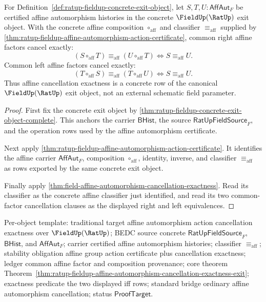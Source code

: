 \begin{theorem}
\label{thm:ratup-fieldup-affine-automorphism-cancellation-exactness-exit}
For Definition~\ref{def:ratup-fieldup-concrete-exit-object}, let
$S,T,U:\mathsf{AffAut}_F$ be certified affine automorphism histories in the
concrete $\FieldUp(\RatUp)$ exit object. With the concrete affine composition
$\circ_{\mathrm{aff}}$ and classifier $\equiv_{\mathrm{aff}}$ supplied by
\autoref{thm:ratup-fieldup-affine-automorphism-action-certificate}, common
right affine factors cancel exactly:
$$
(S\circ_{\mathrm{aff}}T)\equiv_{\mathrm{aff}}(U\circ_{\mathrm{aff}}T)
\Longleftrightarrow S\equiv_{\mathrm{aff}}U.
$$
Common left affine factors cancel exactly:
$$
(T\circ_{\mathrm{aff}}S)\equiv_{\mathrm{aff}}(T\circ_{\mathrm{aff}}U)
\Longleftrightarrow S\equiv_{\mathrm{aff}}U.
$$
Thus affine cancellation exactness is a concrete row of the canonical
$\FieldUp(\RatUp)$ exit object, not an external schematic field parameter.
\end{theorem}
\begin{proof}
First fix the concrete exit object by
\autoref{thm:ratup-fieldup-concrete-exit-object-complete}. This anchors the
carrier $\mathsf{BHist}$, the source $\mathsf{RatUpFieldSource}_F$, and the
operation rows used by the affine automorphism certificate.

Next apply
\autoref{thm:ratup-fieldup-affine-automorphism-action-certificate}. It
identifies the affine carrier $\mathsf{AffAut}_F$, composition
$\circ_{\mathrm{aff}}$, identity, inverse, and classifier
$\equiv_{\mathrm{aff}}$ as rows exported by the same concrete exit object.

Finally apply
\autoref{thm:field-affine-automorphism-cancellation-exactness}. Read its
classifier as the concrete affine classifier just identified, and read its two
common-factor cancellation clauses as the displayed right and left
equivalences.
\end{proof}

Per-object template: traditional target affine automorphism action cancellation
exactness over $\FieldUp(\RatUp)$; BEDC source concrete
$\mathsf{RatUpFieldSource}_F$, $\mathsf{BHist}$, and $\mathsf{AffAut}_F$;
carrier certified affine automorphism histories; classifier
$\equiv_{\mathrm{aff}}$; stability obligation affine group action certificate
plus cancellation exactness; ledger common affine factor and composition
provenance; core theorem
Theorem~\ref{thm:ratup-fieldup-affine-automorphism-cancellation-exactness-exit};
exactness predicate the two displayed iff rows; standard bridge ordinary
affine automorphism cancellation; status $\mathsf{ProofTarget}$.
